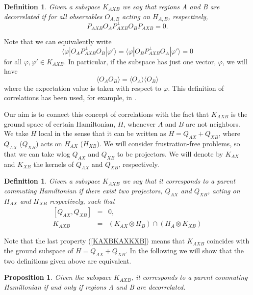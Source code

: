 \documentclass{elsarticle}
\newcommand{\be}{\begin{equation}}
\newcommand{\ee}{\end{equation}}
\newcommand{\bea}{\begin{eqnarray}}
\newcommand{\eea}{\end{eqnarray}}
\newtheorem{prop}[thm]{Proposition}
\newtheorem{defn}[thm]{Definition}
\begin{document}
\begin{defn}
    Given a subspace $K_{AXB}$ we say that regions A and B are decorrelated if for all observables $O_{A,B}$ acting on $H_{A,B}$, respectively,
    \be
        P_{AXB} O_A P_{AXB}^\perp O_B P_{AXB}=0.
    \ee
\end{defn}

Note that we can equivalently write
\be
    \label{decorr}
    \langle \varphi|O_A P_{AXB}^\perp O_B|\varphi'\rangle=\langle \varphi|O_B P_{AXB}^\perp O_A|\varphi'\rangle=0
\ee
for all $\varphi,\varphi'\in K_{AXB}$. In particular, if the subspace has just one vector, $\varphi$, we will have
\be
    \langle O_A O_B\rangle=\langle O_A\rangle \langle O_B \rangle
\ee
where the expectation value is taken with respect to $\varphi$. This definition of correlations has been used, for example, in \cite{Hastingsdefcorr}.

Our aim is to connect this concept of correlations with the fact that $K_{AXB}$ is the ground space of certain Hamiltonian, $H$, whenever $A$ and $B$ are not neighbors. We take $H$ local in the sense that it can be written as $H=Q_{AX} + Q_{XB}$, where $Q_{AX}$ ($Q_{XB}$) acts on $H_{AX}$ ($H_{XB}$). We will consider frustration-free problems, so that we can take wlog $Q_{AX}$ and $Q_{XB}$ to be projectors. We will denote by $K_{AX}$ and $K_{XB}$ the kernels of $Q_{AX}$ and $Q_{XB}$, respectively.
\begin{defn}
    Given a subspace $K_{AXB}$ we say that it corresponds to a parent commuting Hamiltonian if there exist two projectors, $Q_{AX}$ and $Q_{XB}$, acting on $H_{AX}$ and $H_{XB}$ respectively, such that
    \begin{subequations}
        \bea
            \label{QAXQXB}
            [Q_{AX},Q_{XB}]&=& 0,\\
            \label{KAXBKAXKXB}
            K_{AXB} &=& \left(K_{AX}\otimes H_B \right)\cap\left( H_A\otimes K_{XB}\right)
        \eea
    \end{subequations}
\end{defn}

Note that the last property (\ref{KAXBKAXKXB}) means that $K_{AXB}$ coincides with the ground subspace of $H=Q_{AX}+Q_{XB}$.
In the following we will show that the two definitions given above are equivalent.

\begin{prop}
    Given the subspace $K_{AXB}$, it corresponds to a parent commuting Hamiltonian if and only if regions A and B are decorrelated.
\end{prop}
\end{document}
